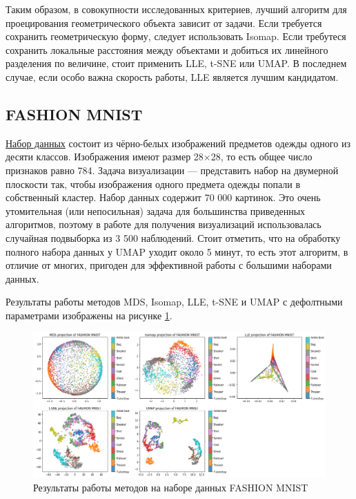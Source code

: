 \documentclass[10pt, a4paper]{extarticle}
\begin{document}
Таким образом, в совокупности исследованных критериев, лучший алгоритм для проецирования геометрического объекта зависит от задачи. Если требуется сохранить геометрическую форму, следует использовать Isomap. Если требутеся сохранить локальные расстояния между объектами и добиться их линейного разделения по величине, стоит применить LLE, t-SNE или UMAP. В последнем случае, если особо важна скорость работы, LLE является лучшим кандидатом.

\subsection{FASHION MNIST}
 \href{https://www.kaggle.com/zalando-research/fashionmnist}{Набор данных} состоит из чёрно-белых изображений предметов одежды одного из десяти классов. Изображения имеют размер 28$\times$28, то есть общее число признаков равно 784. Задача визуализации — представить набор на двумерной плоскости так, чтобы изображения одного предмета одежды попали в собственный кластер. 
 Набор данных содержит 70 000 картинок.
 Это очень утомительная (или непосильная) задача для большинства приведенных алгоритмов, поэтому в работе 
 для получения визуализаций использовалась случайная подвыборка из 3 500 наблюдений.
 Стоит отметить, что на обработку полного набора данных у UMAP уходит около 5 минут, то есть этот алгоритм, в отличие от многих, пригоден для эффективной работы с большими наборами данных.
 
 Результаты работы методов MDS, Isomap, LLE, t-SNE и UMAP с дефолтными параметрами изображены на рисунке \ref{fig:resutls_fmnist}.
 \begin{figure}[h!]
    \vspace{1em}
    \centering
    \includegraphics[width=\linewidth]{fmnist_methods.png}
    \caption{Результаты работы методов на наборе данных FASHION MNIST}
    \label{fig:resutls_fmnist}
\end{figure}
\end{document}
